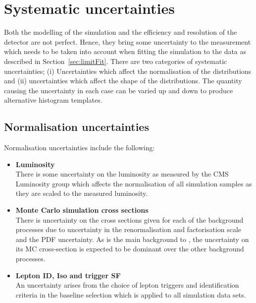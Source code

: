 \section{Systematic uncertainties}
\label{sec:uncertainties}

Both the modelling of the simulation and the efficiency and resolution of the detector are not perfect. Hence, they bring some uncertainty to the measurement which needs to be taken into account when fitting the simulation to the data as described in Section~\ref{sec:limitFit}.
There are two categories of systematic uncertainties; (i) Uncertainties which affect the normalisation of the distributions and (ii) uncertainties which affect the shape of the distributions. The quantity causing the uncertainty in each case can be varied up and down to produce alternative histogram templates.

\subsection{Normalisation uncertainties}
Normalisation uncertainties include the following:
\begin{itemize}
\item \textbf{Luminosity}\\
There is some uncertainty on the luminosity as measured by the CMS Luminosity group which affects the normalisation of all simulation samples as they are scaled to the measured luminosity.

\item \textbf{Monte Carlo simulation cross sections}\\
There is uncertainty on the cross sections given for each of the background processes due to uncertainty in the renormalisation and factorisation scale and the PDF uncertainty. As \ttbar is the main background to \tttt, the uncertainty on its MC cross-section is expected to be dominant over the other background processes. 

\item \textbf{Lepton ID, Iso and trigger SF}\\
An uncertainty arises from the choice of lepton triggers and identification criteria in the baseline selection which is applied to all simulation data sets.


\end{itemize}

